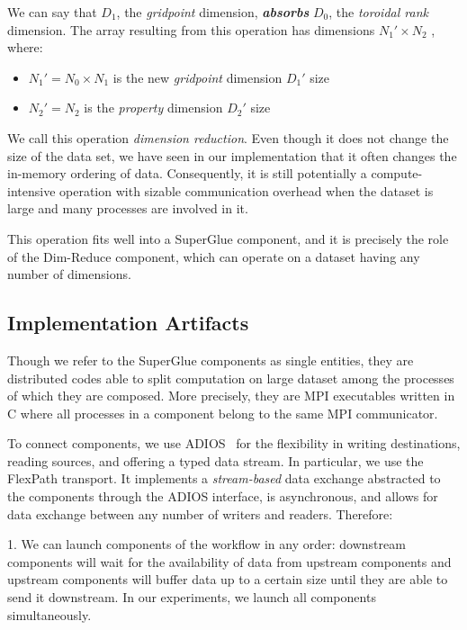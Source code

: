 We can say that $D_1$, the {\em gridpoint} dimension,
\textbf{\em absorbs} $D_0$, the {\em toroidal rank} dimension.
The array resulting from this
operation has dimensions $N_1'{\times}N_2$ , where:

\begin{itemize}

\item $N_1' = N_0{\times}N_1$ is the new {\em gridpoint} dimension $D_1'$ size

\item $N_2' = N_2$ is the {\em property} dimension $D_2'$ size

\end{itemize}

We call this operation {\em dimension reduction}.
Even though it does not
change the size of the data set, we have seen in our implementation 
that it often changes the in-memory
ordering of data. Consequently, it is still potentially a
compute-intensive operation with sizable communication overhead
when the dataset is large and many
processes are involved in it.

This operation fits well into a
SuperGlue component, and it is precisely
the role of the Dim-Reduce
component, which can operate on a dataset having
any number of dimensions.

\subsection{Implementation Artifacts}

Though we refer to the SuperGlue components as single entities,
they are distributed
codes able to split computation on large dataset
among the processes of which they are
composed. More precisely, they are MPI executables written in C
where all processes in a component belong to the
same MPI communicator.

To connect components, we use
ADIOS~\cite{lofstead:2009:adaptable}
for the flexibility in writing destinations,
reading sources, and offering a
typed data stream. In particular, we use
the FlexPath transport. It implements
a {\em stream-based} data exchange abstracted to
the components through the
ADIOS interface, is asynchronous, and allows for
data exchange between any
number of writers and readers. Therefore:

1. We can launch components of the workflow
in any order: downstream components
will wait for the availability of data from
upstream components and upstream
components will buffer data up to a certain
size until they are able to send it
downstream. In our experiments,
we launch all components simultaneously.

